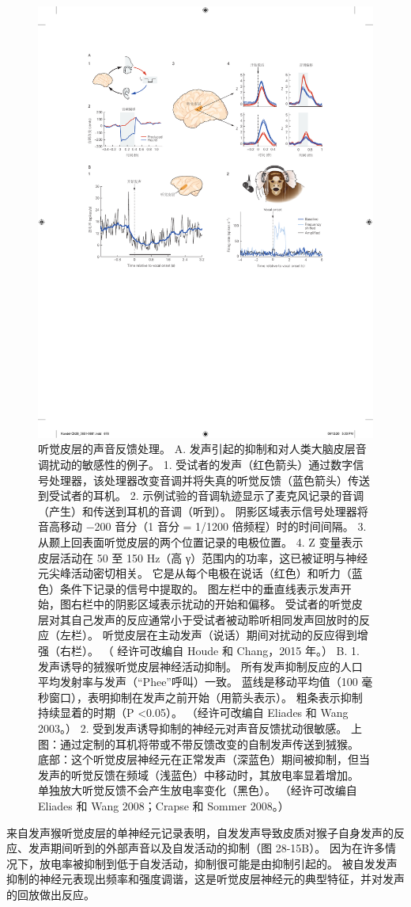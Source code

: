 \begin{figure}[htbp]
	\centering
	\includegraphics[width=0.5\linewidth]{chap28/fig_28_15}
	\caption{听觉皮层的声音反馈处理。 
	A. 发声引起的抑制和对人类大脑皮层音调扰动的敏感性的例子。 
	1. 受试者的发声（红色箭头）通过数字信号处理器，该处理器改变音调并将失真的听觉反馈（蓝色箭头）传送到受试者的耳机。 
	2. 示例试验的音调轨迹显示了麦克风记录的音调（产生）和传送到耳机的音调（听到）。 
	阴影区域表示信号处理器将音高移动 −200 音分（1 音分 = 1/1200 倍频程）时的时间间隔。 
	3. 从颞上回表面听觉皮层的两个位置记录的电极位置。 
	4. Z 变量表示皮层活动在 50 至 150 Hz（高 γ）范围内的功率，这已被证明与神经元尖峰活动密切相关。 
	它是从每个电极在说话（红色）和听力（蓝色）条件下记录的信号中提取的。 
	图左栏中的垂直线表示发声开始，图右栏中的阴影区域表示扰动的开始和偏移。 
	受试者的听觉皮层对其自己发声的反应通常小于受试者被动聆听相同发声回放时的反应（左栏）。 
	听觉皮层在主动发声（说话）期间对扰动的反应得到增强（右栏）。 （
	经许可改编自 Houde 和 Chang，2015 年。）
	B. 1. 发声诱导的狨猴听觉皮层神经活动抑制。 
	所有发声抑制反应的人口平均发射率与发声（“Phee”呼叫）一致。 
	蓝线是移动平均值（100 毫秒窗口），表明抑制在发声之前开始（用箭头表示）。 
	粗条表示抑制持续显着的时期（P <0.05）。 （经许可改编自 Eliades 和 Wang 2003。） 
	2. 受到发声诱导抑制的神经元对声音反馈扰动很敏感。 
	上图：通过定制的耳机将带或不带反馈改变的自制发声传送到狨猴。 
	底部：这个听觉皮层神经元在正常发声（深蓝色）期间被抑制，但当发声的听觉反馈在频域（浅蓝色）中移动时，其放电率显着增加。 
	单独放大听觉反馈不会产生放电率变化（黑色）。 （经许可改编自 Eliades 和 Wang 2008；Crapse 和 Sommer 2008。）}
	\label{fig:28_15}
\end{figure}


来自发声猴听觉皮层的单神经元记录表明，自发发声导致皮质对猴子自身发声的反应、发声期间听到的外部声音以及自发活动的抑制（图 28-15B）。 因为在许多情况下，放电率被抑制到低于自发活动，抑制很可能是由抑制引起的。 被自发发声抑制的神经元表现出频率和强度调谐，这是听觉皮层神经元的典型特征，并对发声的回放做出反应。

